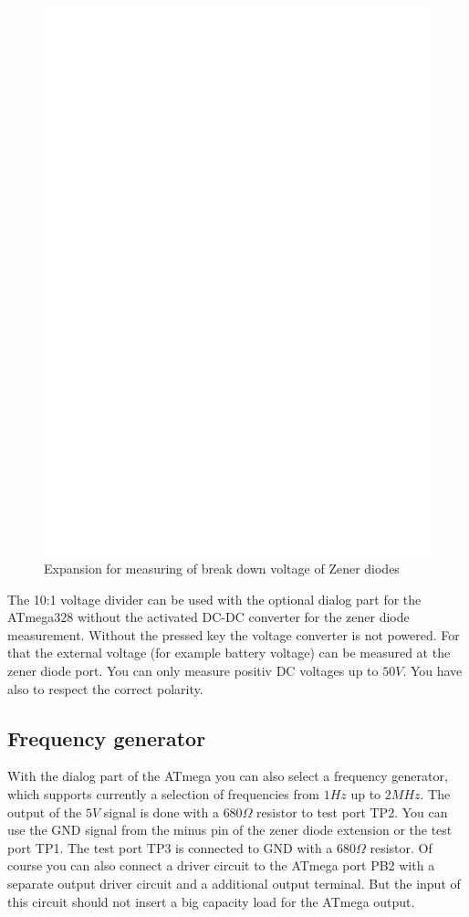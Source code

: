 \begin{figure}[H]
\centering
\includegraphics[width=12cm]{../FIG/zener_exp.eps}
\caption{Expansion for measuring of break down voltage of Zener diodes}
\label{fig:zener}
\end{figure}

The 10:1 voltage divider can be used with the optional dialog part for the ATmega328 without the 
activated DC-DC converter for the zener diode measurement.
Without the pressed key the voltage converter is not powered. For that the external voltage 
(for example battery voltage) can be measured at the zener diode port.
You can only measure positiv DC voltages up to \(50V\).
You have also to respect the correct polarity.

\subsection{Frequency generator}

With the dialog part of the ATmega you can also select a frequency generator, which supports
currently a selection of frequencies from \(1Hz\) up to \(2MHz\).
The output of the \(5V\) signal is done with a \(680\Omega\) resistor to test port TP2.
You can use the GND signal from the minus pin of the zener diode extension or the test port TP1.
The test port TP3 is connected to GND with a \(680\Omega\) resistor.
Of course you can also connect a driver circuit to the ATmega port PB2 with a separate output
driver circuit and a additional output terminal. But the input of this circuit should not insert a
big capacity load for the ATmega output.

